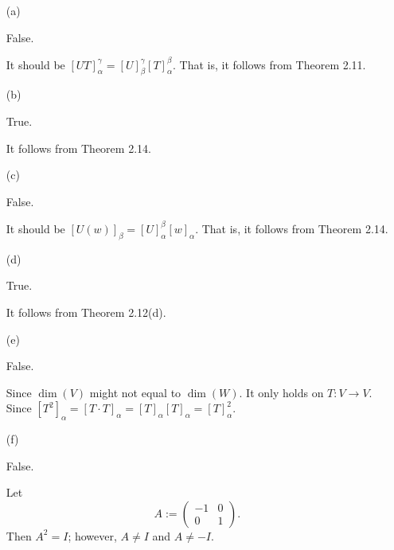 \begin{Exercise}
\begin{enumerate}[(a)]
\item[(a)]
\begin{answer}
False.
\end{answer}
\begin{solution}
It should be $[UT]_{\alpha}^{\gamma} = [U]_{\beta}^{\gamma}[T]_{\alpha}^{\beta}$. That is, it follows from Theorem 2.11.
\end{solution}

\item[(b)]
\begin{answer}
True.
\end{answer}
\begin{solution}
It follows from Theorem 2.14.
\end{solution}

\item[(c)]
\begin{answer}
False.
\end{answer}
\begin{solution}
It should be $[U(w)]_{\beta} = [U]_{\alpha}^{\beta}[w]_{\alpha}$. That is, it follows from Theorem 2.14.
\end{solution}

\item[(d)]
\begin{answer}
True.
\end{answer}
\begin{solution}
It follows from Theorem 2.12(d).
\end{solution}

\item[(e)]
\begin{answer}
False.
\end{answer}
\begin{solution}
Since $\dim(V)$ might not equal to $\dim(W)$.
It only holds on $T:V\to V$. Since $[T^2]_{\alpha} = [T\cdot T]_{\alpha} = [T]_{\alpha}[T]_{\alpha} = [T]_{\alpha}^2$.
\end{solution}

\item[(f)]
\begin{answer}
False.
\end{answer}
\begin{solution}
Let
$$
A := \begin{pmatrix}
-1 & 0 \\
0 & 1
\end{pmatrix}.
$$
Then $A^2 = I$; however, $A\neq I$ and $A\neq -I$.
\end{solution}


\end{enumerate}
\end{Exercise}
